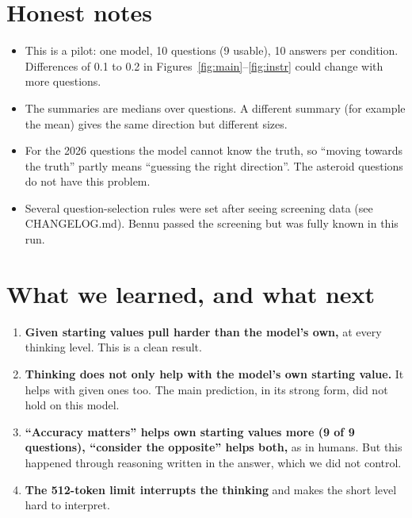 \documentclass[11pt,a4paper]{article}
\begin{document}
\section{Honest notes}
\begin{itemize}
  \item This is a pilot: one model, 10 questions (9 usable), 10 answers per condition. Differences of 0.1 to 0.2 in Figures~\ref{fig:main}--\ref{fig:instr} could change with more questions.
  \item The summaries are medians over questions. A different summary (for example the mean) gives the same direction but different sizes.
  \item For the 2026 questions the model cannot know the truth, so ``moving towards the truth'' partly means ``guessing the right direction''. The asteroid questions do not have this problem.
  \item Several question-selection rules were set after seeing screening data (see CHANGELOG.md). Bennu passed the screening but was fully known in this run.
\end{itemize}

\section{What we learned, and what next}

\begin{enumerate}
  \item \textbf{Given starting values pull harder than the model's own,} at every thinking level. This is a clean result.
  \item \textbf{Thinking does not only help with the model's own starting value.} It helps with given ones too. The main prediction, in its strong form, did not hold on this model.
  \item \textbf{``Accuracy matters'' helps own starting values more (9 of 9 questions), ``consider the opposite'' helps both,} as in humans. But this happened through reasoning written in the answer, which we did not control.
  \item \textbf{The 512-token limit interrupts the thinking} and makes the short level hard to interpret.
\end{enumerate}
\end{document}
